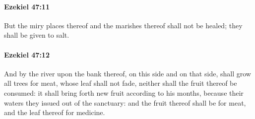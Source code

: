 		\paragraph{Ezekiel 47:11} %
			\label{EZEKIEL-47-11}

			But the miry places thereof and the marishes thereof shall not be healed; they shall be given to salt.


		\paragraph{Ezekiel 47:12} %
			\label{EZEKIEL-47-12}

			And by the river upon the bank thereof, on this side and on that side, shall grow all trees for meat, whose leaf shall not fade, neither shall the fruit thereof be consumed: it shall bring forth new fruit according to his months, because their waters they issued out of the sanctuary: and the fruit thereof shall be for meat, and the leaf thereof for medicine.

